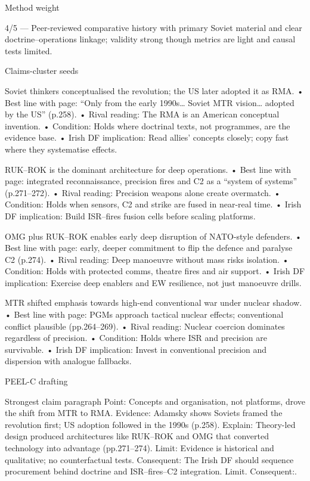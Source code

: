 Method weight

4/5 — Peer-reviewed comparative history with primary Soviet material and clear doctrine–operations linkage; validity strong though metrics are light and causal tests limited.

Claims-cluster seeds

Soviet thinkers conceptualised the revolution; the US later adopted it as RMA.
• Best line with page: “Only from the early 1990s… Soviet MTR vision… adopted by the US” (p.258).
• Rival reading: The RMA is an American conceptual invention.
• Condition: Holds where doctrinal texts, not programmes, are the evidence base.
• Irish DF implication: Read allies’ concepts closely; copy fast where they systematise effects.

RUK–ROK is the dominant architecture for deep operations.
• Best line with page: integrated reconnaissance, precision fires and C2 as a “system of systems” (p.271–272).
• Rival reading: Precision weapons alone create overmatch.
• Condition: Holds when sensors, C2 and strike are fused in near-real time.
• Irish DF implication: Build ISR–fires fusion cells before scaling platforms.

OMG plus RUK–ROK enables early deep disruption of NATO-style defenders.
• Best line with page: early, deeper commitment to flip the defence and paralyse C2 (p.274).
• Rival reading: Deep manoeuvre without mass risks isolation.
• Condition: Holds with protected comms, theatre fires and air support.
• Irish DF implication: Exercise deep enablers and EW resilience, not just manoeuvre drills.

MTR shifted emphasis towards high-end conventional war under nuclear shadow.
• Best line with page: PGMs approach tactical nuclear effects; conventional conflict plausible (pp.264–269).
• Rival reading: Nuclear coercion dominates regardless of precision.
• Condition: Holds where ISR and precision are survivable.
• Irish DF implication: Invest in conventional precision and dispersion with analogue fallbacks.

PEEL-C drafting

Strongest claim paragraph
Point: Concepts and organisation, not platforms, drove the shift from MTR to RMA.
Evidence: Adamsky shows Soviets framed the revolution first; US adoption followed in the 1990s (p.258).
Explain: Theory-led design produced architectures like RUK–ROK and OMG that converted technology into advantage (pp.271–274).
Limit: Evidence is historical and qualitative; no counterfactual tests.
Consequent: The Irish DF should sequence procurement behind doctrine and ISR–fires–C2 integration. Limit. Consequent:.

